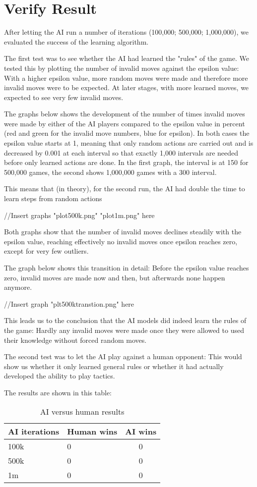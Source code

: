 \section{Verify Result}

After letting the AI run a number of iterations (100,000; 500,000; 1,000,000), we evaluated the success of the learning algorithm.

The first test was to see whether the AI had learned the "rules" of the game. We tested this by plotting the number of invalid moves against the epsilon value: With a higher epsilon value, more random moves were made and therefore more invalid moves were to be expected.
At later stages, with more learned moves, we expected to see very few invalid moves.

The graphs below shows the development of the number of times invalid moves were made by either of the AI players compared to the epsilon value in percent (red and green for the invalid move numbers, blue for epsilon).
In both cases the epsilon value starts at 1, meaning that only random actions are carried out and is decreased by 0.001 at each interval so that exactly 1,000 intervals are needed before only learned actions are done. In the first graph, the interval is at 150 for 500,000 games, the second shows 1,000,000 games with a 300 interval.

This means that (in theory), for the second run, the AI had double the time to learn steps from random actions

//Insert graphs "plot500k.png"  "plot1m.png" here

Both graphs show that the number of invalid moves declines steadily with the epsilon value, reaching effectively no invalid moves once epsilon reaches zero, except for very few outliers.

The graph below shows this transition in detail: Before the epsilon value reaches zero, invalid moves are made now and then, but afterwards none happen anymore.

//Insert graph "plt500ktranstion.png" here

This leads us to the conclusion that the AI models did indeed learn the rules of the game: Hardly any invalid moves were made once they were allowed to used their knowledge without forced random moves.


The second test was to let the AI play against a human opponent: This would show us whether it only learned general rules or whether it had actually developed the ability to play tactics.

The results are shown in this table:

\begin{table}[H]
	\begin{tabular}{|l|l|c|}\hline
		AI iterations & Human wins & AI wins \\ \hline \hline
		100k & 0 & 0 \\ \hline
		500k & 0 & 0 \\ \hline
		1m & 0 & 0 \\ \hline
	\end{tabular}
	\caption{AI versus human results}
	\label{aiGameResults}
\end{table}